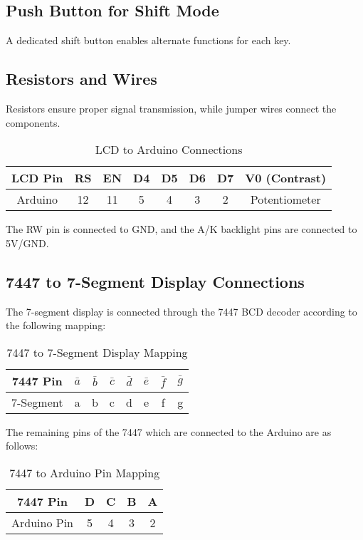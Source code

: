 \documentclass[a4paper,12pt]{article}
\begin{document}
\subsection{Push Button for Shift Mode}
A dedicated shift button enables alternate functions for each key.

\subsection{Resistors and Wires}
Resistors ensure proper signal transmission, while jumper wires connect the components.
\begin{table}[h]
    \centering
    \begin{tabular}{|c|c|c|c|c|c|c|c|}
        \hline
        LCD Pin & RS  & EN  & D4  & D5  & D6  & D7  & V0 (Contrast) \\ \hline
        Arduino & 12  & 11  & 5  & 4  & 3  & 2  & Potentiometer \\ \hline
    \end{tabular}
    \caption{LCD to Arduino Connections}
\end{table}

The RW pin is connected to GND, and the A/K backlight pins are connected to 5V/GND.

\subsection{7447 to 7-Segment Display Connections}
The 7-segment display is connected through the 7447 BCD decoder according to the following mapping:

\begin{table}[h]
    \centering
    \begin{tabular}{|c|c|c|c|c|c|c|c|}
        \hline
        7447 Pin & $\bar{a}$ & $\bar{b}$ & $\bar{c}$ & $\bar{d}$ & $\bar{e}$ & $\bar{f}$ & $\bar{g}$ \\ \hline
        7-Segment & a & b & c & d & e & f & g \\ \hline
    \end{tabular}
    \caption{7447 to 7-Segment Display Mapping}
\end{table}

The remaining pins of the 7447 which are connected to the Arduino are as follows:

\begin{table}[h]
    \centering
    \begin{tabular}{|c|c|c|c|c|}
        \hline
        7447 Pin & D & C & B & A \\ \hline
        Arduino Pin & 5 & 4 & 3 & 2 \\ \hline
    \end{tabular}
    \caption{7447 to Arduino Pin Mapping}
\end{table}
\end{document}
